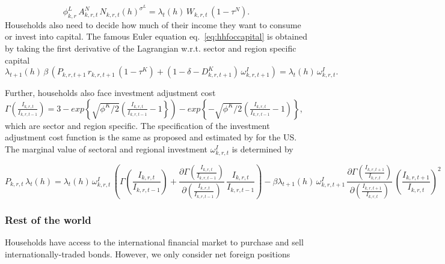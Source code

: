 \documentclass[10pt,a4paper]{article}
\begin{document}
\begin{dmath}\label{eq:hhlaboursupply}
\phi^{L}_{k,r} \, A^{N}_{k,r,t} \, N_{k,r,t}(h)^{\sigma^{L}} = \lambda_{t}(h) \, W_{k,r,t} \, (1 - \tau^{N}).
\end{dmath}
Households also need to decide how much of their income they want to consume or invest into capital. The famous Euler equation eq.~\ref{eq:hhfoccapital} is obtained by taking the first derivative of the Lagrangian w.r.t. sector and region specific capital
\begin{dmath}\label{eq:hhfoccapital}
\lambda_{t+1}(h) \, \beta \, \left(P_{k,r,t+1} \, r_{k,r,t+1} \, (1 - \tau^K) + (1 - \delta - D^{K}_{k,r,t+1}) \, \omega^{I}_{k,r,t+1} \right) = \lambda_{t}(h) \, \omega^{I}_{k,r,t}.
\end{dmath}

Further, households also face investment adjustment cost $\Gamma(\frac{I_{k,r,t}}{I_{k,r,t-1}}) = 3 - exp\left\lbrace\sqrt{\phi^{K}/2}\left(\frac{I_{k,r,t}}{I_{k,r,t-1}}-1\right\rbrace\right) - exp\left\lbrace-\sqrt{\phi^{K}/2}\left(\frac{I_{k,r,t}}{I_{k,r,t-1}}-1\right)\right\rbrace$, which are sector and region specific. The specification of the investment adjustment cost function is the same as proposed and estimated by \cite{christiano2014risk} for the US.  The marginal value of sectoral and regional investment $\omega^{I}_{k,r,t}$ is determined by

\begin{dmath}\label{eq:hhfocinvestment}
P_{k,r,t} \, \lambda_{t}(h) = \lambda_{t}(h) \, \omega^{I}_{k,r,t} \, \left(\Gamma(\frac{I_{k,r,t}}{I_{k,r,t-1}}) + \frac{\partial \Gamma(\frac{I_{k,r,t}}{I_{k,r,t-1}})}{\partial (\frac{I_{k,r,t}}{I_{k,r,t-1}})} \, \frac{I_{k,r,t}}{I_{k,r,t-1}} \right) - \beta \lambda_{t+1}(h) \, \omega^{I}_{k,r,t+1} \, \frac{\partial \Gamma(\frac{I_{k,r,t+1}}{I_{k,r,t}})}{\partial (\frac{I_{k,r,t+1}}{I_{k,r,t}})} \, \left(\frac{I_{k,r,t+1}}{I_{k,r,t}}\right)^2
\end{dmath}

\subsubsection{Rest of the world}
Households have access to the international financial market to purchase and sell internationally-traded bonds. However, we only consider net foreign positions 
\end{document}
